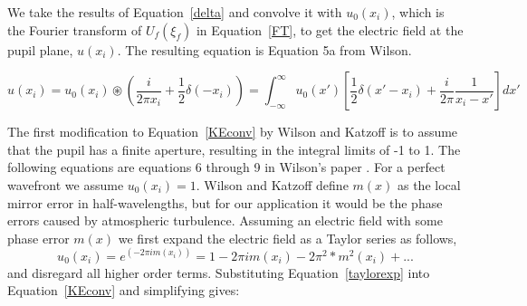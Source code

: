 


We take the results of Equation~\ref{delta} and convolve it with $u_0(x_i)$, which is the Fourier transform of $U_f(\xi_f)$ in Equation~\ref{FT}, to get the electric field at the pupil plane, $u(x_i)$. The resulting equation is Equation 5a from Wilson.\citep{wilson1975wavefront}



\begin{equation}
    u(x_i)= u_0(x_i) \circledast \left(
        \frac{i}{2\pi x_i}+\frac{1}{2}\delta(-x_i)
    \right)
    =
    \int_{-\infty}^\infty
    u_0(x') \left[
        \frac{1}{2}\delta(x'-x_i)+\frac{i}{2\pi}\frac{1}{x_i-x'}
    \right] dx' 
    \label{KEconv}
\end{equation}

The first modification to Equation~\ref{KEconv} by Wilson and Katzoff is to assume that the pupil has a finite aperture, resulting in the integral limits of -1 to 1. The following equations are equations 6 through 9 in Wilson's paper \citep{wilson1975wavefront}. For a perfect wavefront we assume $u_0 (x_i )=1$.  Wilson and Katzoff define $m(x)$ as the local mirror error in half-wavelengths, but for our application it would be the phase errors caused by atmospheric turbulence. Assuming an electric field with some phase error $m(x)$ we first expand the electric field as a Taylor series as follows,
\begin{equation}
    u_0 (x_i )=e^{(-2\pi i m(x_i ))}=1-2\pi i m(x_i )-2\pi^2*m^2 (x_i )+...
    \label{taylorexp}
\end{equation}
\noindent and disregard all higher order terms. Substituting Equation~\ref{taylorexp} into Equation~\ref{KEconv} and simplifying gives:


